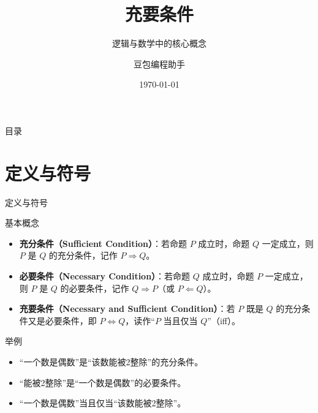 \documentclass[UTF8]{beamer}
\begin{document}
\title{充要条件}
\subtitle{逻辑与数学中的核心概念}
\author{豆包编程助手}
\date{\today}
\begin{frame}
  \titlepage
\end{frame}

\begin{frame}{目录}
  \tableofcontents
\end{frame}

\section{定义与符号}
\begin{frame}{定义与符号}
  \begin{block}{基本概念}
    \begin{itemize}
      \item<1-> \textbf{充分条件（Sufficient Condition）}：若命题 \( P \) 成立时，命题 \( Q \) 一定成立，则 \( P \) 是 \( Q \) 的充分条件，记作 \( P \Rightarrow Q \)。
      \item<2-> \textbf{必要条件（Necessary Condition）}：若命题 \( Q \) 成立时，命题 \( P \) 一定成立，则 \( P \) 是 \( Q \) 的必要条件，记作 \( Q \Rightarrow P \)（或 \( P \Leftarrow Q \)）。
      \item<3-> \textbf{充要条件（Necessary and Sufficient Condition）}：若 \( P \) 既是 \( Q \) 的充分条件又是必要条件，即 \( P \Leftrightarrow Q \)，读作“\( P \) 当且仅当 \( Q \)”（iff）。
    \end{itemize}
  \end{block}
  
  \begin{exampleblock}{举例}
    \begin{itemize}
      \item<4-> “一个数是偶数”是“该数能被2整除”的充分条件。
      \item<5-> “能被2整除”是“一个数是偶数”的必要条件。
      \item<6-> “一个数是偶数”当且仅当“该数能被2整除”。
    \end{itemize}
  \end{exampleblock}
\end{frame}

\end{document}
